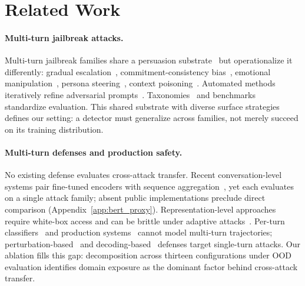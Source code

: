
\section{Related Work}

\paragraph{Multi-turn jailbreak attacks.}
Multi-turn jailbreak families share a persuasion substrate~\citep{zeng2024pap,hagendorff2026reasoning,li2024mhj} but operationalize it differently: gradual escalation~\citep{russinovich2024crescendo}, commitment-consistency bias~\citep{fitd2024}, emotional manipulation~\citep{deceptivedelight2024}, persona steering~\citep{ren2024actorattack}, context poisoning~\citep{alobaid2026echochamber}. Automated methods~\citep{chao2023pair,mehrotra2024tap} iteratively refine adversarial prompts~\citep{perez2022redteaming}. Taxonomies~\citep{wei2023jailbroken} and benchmarks~\citep{mazeika2024harmbench,chao2024jailbreakbench,jiang2024redqueen,song2026multibreak} standardize evaluation. This shared substrate with diverse surface strategies defines our setting: a detector must generalize across families, not merely succeed on its training distribution.

\paragraph{Multi-turn defenses and production safety.}
No existing defense evaluates cross-attack transfer. Recent conversation-level systems pair fine-tuned encoders with sequence aggregation~\citep{deepcontext2026,tong2025biid,gguard2025,safedream2026}, yet each evaluates on a single attack family; absent public implementations preclude direct comparison (Appendix~\ref{app:bert_proxy}). Representation-level approaches~\citep{lu2025xboundary,zhang2025jbshield,xie2024gradsafe,zou2024circuitbreakers,wu2025safeint,shen2024jailbreakantidote,yousefpour2025repbend,kulkarni2026latentadversarial,kadali2025internallayers,kadali2026trace,hua2026rcs} require white-box access and can be brittle under adaptive attacks~\citep{derya2026revisitingjbshield}. Per-turn classifiers~\citep{inan2023llamaguard,metallamaguard3_2024,zeng2024shieldgemma,han2024wildguard,anthropic2025constitutional} and production systems~\citep{markov2023holistic} cannot model multi-turn trajectories; perturbation-based~\citep{robey2024smoothllm} and decoding-based~\citep{xu2024safedecoding} defenses target single-turn attacks. Our ablation fills this gap: decomposition across thirteen configurations under OOD evaluation identifies domain exposure as the dominant factor behind cross-attack transfer.

